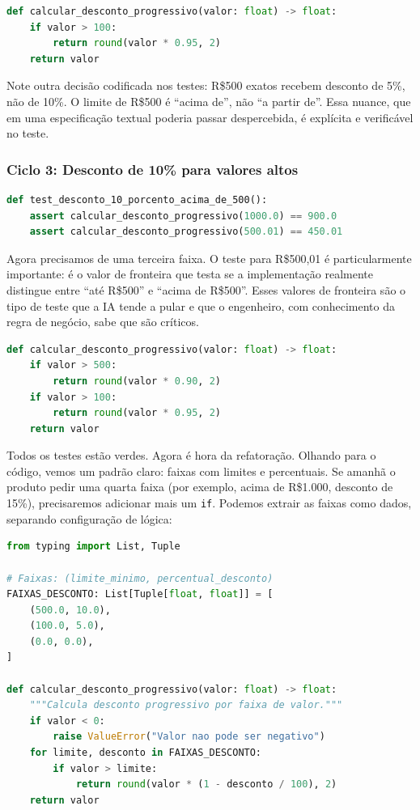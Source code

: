\begin{lstlisting}[language=Python, caption={Ciclo 2 --- Green: adicionando a primeira faixa}]
def calcular_desconto_progressivo(valor: float) -> float:
    if valor > 100:
        return round(valor * 0.95, 2)
    return valor
\end{lstlisting}

Note outra decisão codificada nos testes: R\$500 exatos recebem desconto de
5\%, não de 10\%. O limite de R\$500 é ``acima de'', não ``a partir de''. Essa
nuance, que em uma especificação textual poderia passar despercebida, é
explícita e verificável no teste.

\subsubsection{Ciclo 3: Desconto de 10\% para valores altos}

\begin{lstlisting}[language=Python, caption={Ciclo 3 --- Red: teste para faixa alta}]
def test_desconto_10_porcento_acima_de_500():
    assert calcular_desconto_progressivo(1000.0) == 900.0
    assert calcular_desconto_progressivo(500.01) == 450.01
\end{lstlisting}

Agora precisamos de uma terceira faixa. O teste para R\$500,01 é
particularmente importante: é o valor de fronteira que testa se a
implementação realmente distingue entre ``até R\$500'' e ``acima de R\$500''.
Esses valores de fronteira são o tipo de teste que a IA tende a
pular e que o engenheiro, com conhecimento da regra de negócio, sabe que são
críticos.

\begin{lstlisting}[language=Python, caption={Ciclo 3 --- Green: implementação completa}]
def calcular_desconto_progressivo(valor: float) -> float:
    if valor > 500:
        return round(valor * 0.90, 2)
    if valor > 100:
        return round(valor * 0.95, 2)
    return valor
\end{lstlisting}

Todos os testes estão verdes. Agora é hora da refatoração. Olhando para o
código, vemos um padrão claro: faixas com limites e percentuais. Se amanhã o
produto pedir uma quarta faixa (por exemplo, acima de R\$1.000, desconto de
15\%), precisaremos adicionar mais um \texttt{if}. Podemos extrair as faixas
como dados, separando configuração de lógica:

\begin{lstlisting}[language=Python, caption={Ciclo 3 --- Refactor: extraindo as faixas}]
from typing import List, Tuple

# Faixas: (limite_minimo, percentual_desconto)
FAIXAS_DESCONTO: List[Tuple[float, float]] = [
    (500.0, 10.0),
    (100.0, 5.0),
    (0.0, 0.0),
]

def calcular_desconto_progressivo(valor: float) -> float:
    """Calcula desconto progressivo por faixa de valor."""
    if valor < 0:
        raise ValueError("Valor nao pode ser negativo")
    for limite, desconto in FAIXAS_DESCONTO:
        if valor > limite:
            return round(valor * (1 - desconto / 100), 2)
    return valor
\end{lstlisting}

